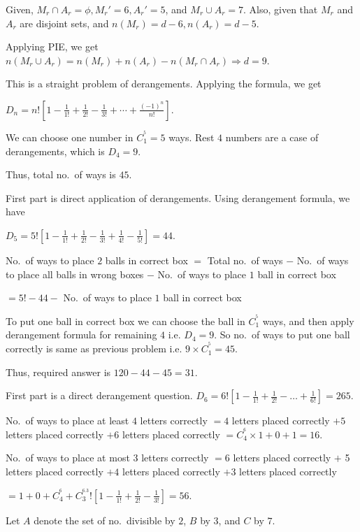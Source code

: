   Given, $M_r\cap A_r = \phi, M_r' = 6, A_r' = 5$, and $M_r\cup A_r = 7$. Also, given that $M_r$ and $A_r$
  are disjoint sets, and $n(M_r) = d - 6, n(A_r) = d - 5$.

  Applying PIE, we get $n(M_r\cup A_r) = n(M_r) + n(A_r) - n(M_r\cap A_r) \Rightarrow d = 9$.
\item This is a straight problem of derangements. Applying the formula, we get

  $D_n = n!\left[1 - \frac{1}{1!} + \frac{1}{2!} - \frac{1}{3!} + \cdots + \frac{(-1)^n}{n!}\right]$.
\item We can choose one number in $C_1^^5 = 5$ ways. Rest $4$ numbers are a case of derangements, which is
  $D_4 = 9$.

  Thus, total no.\ of ways is $45$.
\item First part is direct application of derangements. Using derangement formula, we have

  $D_5 = 5!\left[1 - \frac{1}{1!} + \frac{1}{2!} - \frac{1}{3!} + \frac{1}{4!} - \frac{1}{5!}\right] = 44$.

  No.\ of ways to place $2$ balls in correct box $=$ Total no.\ of ways $-$ No.\ of ways to place all balls
  in wrong boxes $-$ No.\ of ways to place $1$ ball in correct box

  $= 5! - 44 -$ No.\ of ways to place $1$ ball in correct box

  To put one ball in correct box we can choose the ball in $C_1^^5$ ways, and then apply derangement formula
  for remaining $4$ i.e. $D_4 = 9$. So no.\ of ways to put one ball correctly is same as previous problem
  i.e. $9\times C_1^^5 = 45$.

  Thus, required answer is $120 - 44 - 45 = 31$.
\item First part is a direct derangement question. $D_6 = 6!\left[1 - \frac{1}{1!} + \frac{1}{2!} - \ldots +
  \frac{1}{6!}\right] = 265$.

  No.\ of ways to place at least $4$ letters correctly $= 4$ letters placed correctly $+ 5$ letters placed
  correctly $+ 6$ letters placed correctly $= C_4^^6\times 1 + 0 + 1 = 16$.

  No.\ of ways to place at most $3$ letters correctly $= 6$ letters placed correctly $+ $ 5 letters placed
  correctly $+ 4$ letters placed correctly $+ 3$ letters placed correctly

  $= 1 + 0 + C_4^^6 + C_3^^6.3!\left[1 - \frac{1}{1!} + \frac{1}{2!} - \frac{1}{3!}\right] = 56$.
\item Let $A$ denote the set of no.\ divisible by $2$, $B$ by $3$, and $C$ by $7$.

